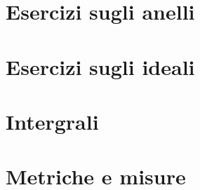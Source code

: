 \section{Esercizi sugli anelli} 
\section{Esercizi sugli ideali} 
\section{Intergrali} 
\section{Metriche e misure} 
